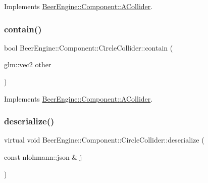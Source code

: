 Implements \mbox{\hyperlink{class_beer_engine_1_1_component_1_1_a_collider_ae972d39620da804c72fb9799c167bf4b}{Beer\+Engine\+::\+Component\+::\+A\+Collider}}.

\mbox{\label{class_beer_engine_1_1_component_1_1_circle_collider_a0660c296e993b8bfbebb8524bca4cea7}} 
\subsubsection{\texorpdfstring{contain()}{contain()}}
{\footnotesize\ttfamily bool Beer\+Engine\+::\+Component\+::\+Circle\+Collider\+::contain (\begin{DoxyParamCaption}\item[{glm\+::vec2}]{other }\end{DoxyParamCaption})\hspace{0.3cm}{\ttfamily [virtual]}}



Implements \mbox{\hyperlink{class_beer_engine_1_1_component_1_1_a_collider_a3d7b4784b8ba49a9d0fe72e8ff00ad1e}{Beer\+Engine\+::\+Component\+::\+A\+Collider}}.

\mbox{\label{class_beer_engine_1_1_component_1_1_circle_collider_a25651d52d7b584deb7f82b09037124d5}} 
\subsubsection{\texorpdfstring{deserialize()}{deserialize()}}
{\footnotesize\ttfamily virtual void Beer\+Engine\+::\+Component\+::\+Circle\+Collider\+::deserialize (\begin{DoxyParamCaption}\item[{const nlohmann\+::json \&}]{j }\end{DoxyParamCaption})\hspace{0.3cm}{\ttfamily [virtual]}}



